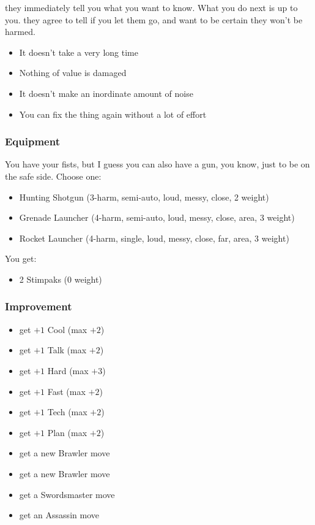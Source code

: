 
{they immediately tell you what you want to know. What you do next is up to you.}
{they agree to tell if you let them go, and want to be certain they won't be harmed.}



\begin{itemize}
\item It doesn’t take a very long time
\item Nothing of value is damaged
\item It doesn’t make an inordinate amount of noise
\item You can fix the thing again without a lot of effort
\end{itemize}

\subsubsection{Equipment}
You have your fists, but I guess you can also have a gun, you know, just to be on the safe side. Choose one:
\begin{itemize}
\item Hunting Shotgun (3-harm, semi-auto, loud, messy, close, 2 weight)
\item Grenade Launcher (4-harm, semi-auto, loud, messy, close, area, 3 weight)
\item Rocket Launcher (4-harm, single, loud, messy, close, far, area, 3 weight)
\end{itemize}

You get:
\begin{itemize}
\item 2 Stimpaks (0 weight)
\end{itemize}

\subsubsection{Improvement}
\begin{itemize}
\item get $+1$ Cool (max $+2$)
\item get $+1$ Talk (max $+2$)
\item get $+1$ Hard (max $+3$)
\item get $+1$ Fast (max $+2$)
\item get $+1$ Tech (max $+2$)
\item get $+1$ Plan (max $+2$)
\item get a new Brawler move
\item get a new Brawler move
\item get a Swordsmaster move
\item get an Assassin move
\end{itemize}



